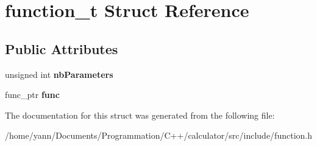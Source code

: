 \hypertarget{structfunction__t}{\section{function\-\_\-t Struct Reference}
\label{structfunction__t}
}
\subsection*{Public Attributes}
\begin{DoxyCompactItemize}
\item 
\hypertarget{structfunction__t_a647add70a5264bc6bea452726cae9591}{unsigned int {\bfseries nb\-Parameters}}\label{structfunction__t_a647add70a5264bc6bea452726cae9591}

\item 
\hypertarget{structfunction__t_a037cf75435952339d3d885e69eddb87e}{func\-\_\-ptr {\bfseries func}}\label{structfunction__t_a037cf75435952339d3d885e69eddb87e}

\end{DoxyCompactItemize}


The documentation for this struct was generated from the following file\-:\begin{DoxyCompactItemize}
\item 
/home/yann/\-Documents/\-Programmation/\-C++/calculator/src/include/function.\-h\end{DoxyCompactItemize}

